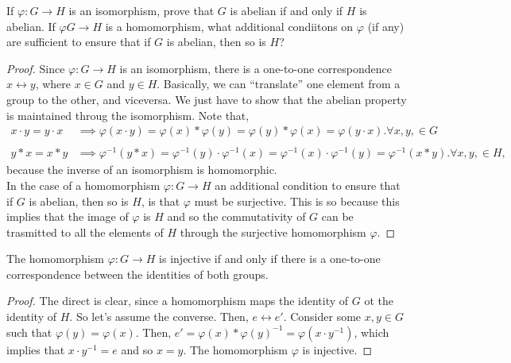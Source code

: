 \documentclass[12pt]{article}
\newenvironment{problem}[2][Problem]{\begin{trivlist} \item[\hskip \labelsep {\bfseries #1}\hskip \labelsep {\bfseries #2.}]}{\end{trivlist}}
\begin{document}
\begin{problem}{3}
  If $\varphi:G\to H$ is an isomorphism, prove that $G$ is abelian if and only if $H$ is abelian. If $\varphi G\to H$ is a homomorphism, what additional condiitons on $\varphi$ (if any) are sufficient to ensure that if $G$ is abelian, then so is $H$?
\begin{proof}
  Since $\varphi:G\to H$ is an isomorphism, there is a one-to-one correspondence $x\leftrightarrow y$, where $x\in G$ and $y\in H$. Basically, we can ``translate'' one element from a group to the other, and viceversa. We just have to show that the abelian property is maintained throug the isomorphism. Note that,
\begin{align*}
  x\cdot y = y\cdot x &\implies \varphi(x\cdot y) = \varphi(x) * \varphi(y) = \varphi(y) * \varphi(x) = \varphi (y\cdot x). \forall x,y,\in G\\
  \\
  y*x =x*y &\implies \varphi^{-1}(y*x) = \varphi^{-1}(y)\cdot \varphi^{-1}(x) = \varphi^{-1}(x)\cdot \varphi^{-1}(y) = \varphi^{-1}(x*y). \forall x,y,\in H,
\end{align*}
because the inverse of an isomorphism is homomorphic.\\
In the case of a homomorphism $\varphi: G\to H$ an additional condition to ensure that if $G$ is abelian, then so is $H$, is that $\varphi$ must be surjective. This is so because this implies that the image of $\varphi$ is $H$ and so the commutativity of $G$ can be trasmitted to all the elements of $H$ through the surjective homomorphism $\varphi$. 
\end{proof}
\end{problem}

\begin{problem}{I}
  The homomorphism $\varphi:G\to H$ is injective if and only if there is a one-to-one correspondence between the identities of both groups.
\begin{proof}
  The direct is clear, since a homomorphism maps the identity of $G$ ot the identity of $H$. So let's assume the converse. Then, $e\leftrightarrow e'$. Consider some $x,y \in G$ such that $\varphi(y) = \varphi(x)$. Then, $e' = \varphi(x)* \varphi(y)^{-1} = \varphi(x\cdot y^{-1})$, which implies that $x\cdot y^{-1}=e$ and so $x=y$. The homomorphism $\varphi$ is injective.
\end{proof}
\end{problem}
\end{document}
